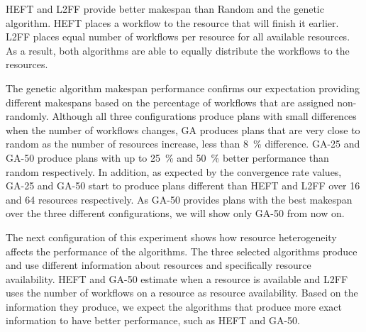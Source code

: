 HEFT and L2FF provide better makespan than Random and the genetic algorithm.
HEFT places a workflow to the resource that will finish it earlier.
L2FF places equal number of workflows per resource for all available resources.
As a result, both algorithms are able to equally distribute the workflows to the resources.

The genetic algorithm makespan performance confirms our expectation providing different makespans based on the percentage of workflows that are assigned non-randomly.
Although all three configurations produce plans with small differences when the number of workflows changes, GA produces plans that are very close to random as the number of resources increase, less than 8~\% difference.
GA-25 and GA-50 produce plans with up to 25~\% and 50~\% better performance than random respectively.
In addition, as expected by the convergence rate values, GA-25 and GA-50 start to produce plans different than HEFT and L2FF over 16 and 64 resources respectively.
As GA-50 provides plans with the best makespan over the three different configurations, we will show only GA-50 from now on.

The next configuration of this experiment shows how resource heterogeneity affects the performance of the algorithms.
The three selected algorithms produce and use different information about resources and specifically resource availability.
HEFT and GA-50 estimate when a resource is available and L2FF uses the number of workflows on a resource as resource availability.
Based on the information they produce, we expect the algorithms that produce more exact information to have better performance, such as HEFT and GA-50.

